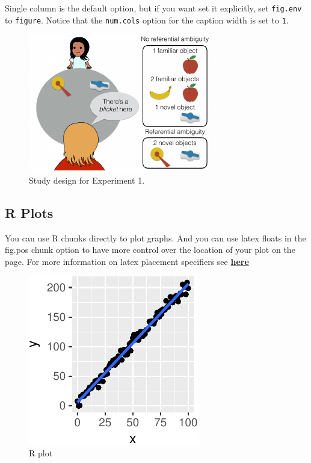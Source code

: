 \documentclass[10pt, letterpaper]{article}
\newenvironment{CodeChunk}{}{}
\begin{document}
Single column is the default option, but if you want set it explicitly,
set \texttt{fig.env} to \texttt{figure}. Notice that the
\texttt{num.cols} option for the caption width is set to \texttt{1}.

\begin{CodeChunk}
\captionsetup{width=0.8\columnwidth}\begin{figure}[H]

{\centering \includegraphics{figs/image-1} 

}

\caption[Study design for Experiment 1]{Study design for Experiment 1.}\label{fig:image}
\end{figure}
\end{CodeChunk}

\subsection{R Plots}\label{r-plots}

You can use R chunks directly to plot graphs. And you can use latex
floats in the fig.pos chunk option to have more control over the
location of your plot on the page. For more information on latex
placement specifiers see
\textbf{\href{https://en.wikibooks.org/wiki/LaTeX/Floats,_Figures_and_Captions}{here}}

\begin{CodeChunk}
\begin{figure}[H]

{\centering \includegraphics{figs/plot-1} 

}

\caption[R plot]{R plot}\label{fig:plot}
\end{figure}
\end{CodeChunk}
\end{document}
